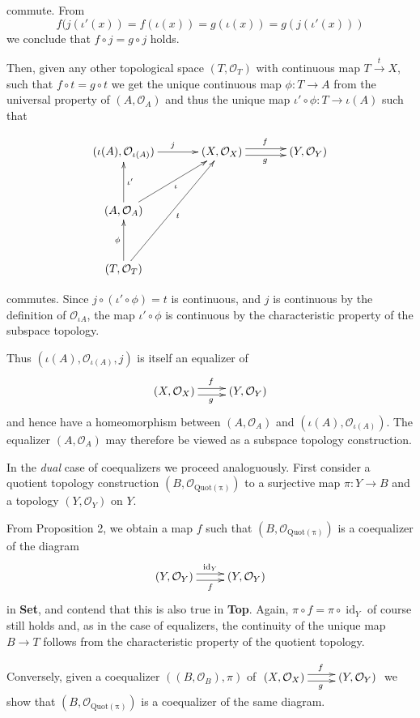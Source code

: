 \documentclass[a4paper]{amsart}            %
\renewcommand{\O}{\mathcal{O}}
\newcommand{\id}{\operatorname{id}}
\theoremstyle{plain}                                               %
\begin{document}
commute. From \[f(j(\iota'(x))=f(\iota(x))=g(\iota(x))=g(j(\iota'(x)))\] we conclude that $f \circ j = g \circ j$ holds. 

Then, given any other topological space $(T, \O_T)$ with continuous map $T \xrightarrow{t} X$, such that $f \circ t = g \circ t$ we get the unique continuous map $\phi: T \to A$ from the universal property of $(A, \O_A)$ and thus the unique map $\iota' \circ \phi: T \to \iota(A)$ such that 

\begin{align*} \xymatrix@+=1.25cm{(\iota(A),\O_{\iota(A)}) \ar[r]^{j} & (X,\O_X) \ar@<0.66ex>[r]^{f} \ar@<-0.66ex>[r]_{g} & (Y,\O_Y) \\
																										 (A,\O_A) \ar[u]_{\iota'} \ar[ur]_\iota \\(T,\mathcal{O}_T) \ar[u]^{\phi} \ar[uur]_t } \end{align*}
																										 
commutes. Since $j \circ (\iota' \circ \phi) = t$ is continuous, and $j$ is continuous by the definition of $\mathcal{O}_{\iota{A}}$, the map $\iota' \circ \phi$ is continuous by the characteristic property of the subspace topology. 

Thus $(\iota(A),\O_{\iota(A)}, j)$ is itself an equalizer of \[\xymatrix{(X,\O_X) \ar@<0.66ex>[r]^{f} \ar@<-0.66ex>[r]_{g} &(Y,\O_Y)}\] and hence have a homeomorphism between $(A,\O_A)$ and $(\iota(A), \O_{\iota(A)})$. The equalizer $(A,\O_A)$ may therefore be viewed as a subspace topology construction.

\bigskip

In the \emph{dual} case of coequalizers we proceed analoguously. First consider a quotient topology construction $(B,\O_{\operatorname{Quot(\pi)}})$ to a surjective map $\pi: Y \to B$ and a topology $(Y,\O_Y)$ on $Y$. 

From Proposition 2, we obtain a map $f$ such that $(B,\O_{\operatorname{Quot(\pi)}})$ is a coequalizer of the diagram \[\xymatrix{(Y,\O_Y) \ar@<0.66ex>[r]^-{\id_Y} \ar@<-0.66ex>[r]_-{f} &(Y,\O_Y)}\] in \textbf{Set}, and contend that this is also true in \textbf{Top}. Again, $\pi \circ f = \pi \circ \id_Y$ of course still holds and, as in the case of equalizers, the continuity of the unique map $B \rightarrow T$ follows from the characteristic property of the quotient topology. 

Conversely, given a coequalizer $((B,\O_B),\pi)$ of $\xymatrix{(X,\O_X) \ar@<0.66ex>[r]^{f} \ar@<-0.66ex>[r]_{g} &(Y,\O_Y)}$ we show that $(B,\O_{\operatorname{Quot(\pi)}})$ is a coequalizer of the same diagram. 
\end{document}
